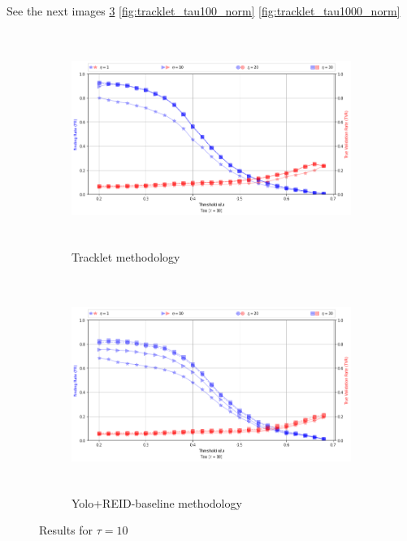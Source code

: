 \documentclass{article}
\begin{document}
See the next images \ref{fig:tracklet_tau10_norm} \ref{fig:tracklet_tau100_norm} \ref{fig:tracklet_tau1000_norm}


\begin{figure}[H]
    \begin{subfigure}{0.9\textwidth}
        \includegraphics[width=12cm, height=7cm]{images_results/tracklet_tau10_norm.png} 
        \caption{Tracklet methodology}
        \label{fig:subim1}
    \end{subfigure}
    
    \begin{subfigure}{0.9\textwidth}
        \includegraphics[width=12cm, height=7cm]{images_results/yolo_tau10_norm.png}
        \caption{Yolo+REID-baseline methodology}
        \label{fig:subim2}
    \end{subfigure}

\caption{Results for $\tau = 10$}
\label{fig:tracklet_tau10_norm}
\end{figure}
\end{document}
